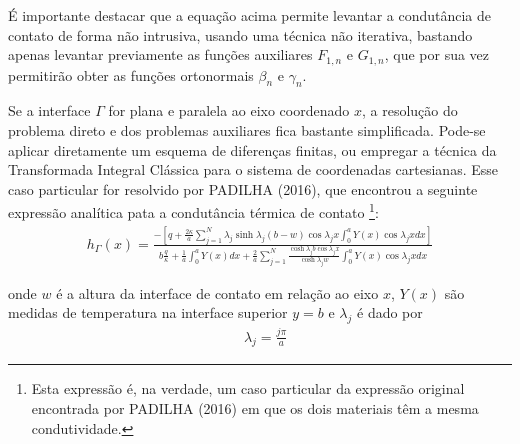 É importante destacar que a equação acima permite levantar a condutância de contato de forma não intrusiva, usando uma técnica não iterativa, bastando
apenas levantar previamente as funções auxiliares $F_{1, n}$ e $G_{1, n}$, que por sua vez permitirão obter as funções ortonormais $\beta_n$ e $\gamma_n$.

Se a interface $\Gamma$ for plana e paralela
ao eixo coordenado $x$, a resolução do problema direto e dos problemas auxiliares fica bastante simplificada. Pode-se aplicar diretamente
um esquema de diferenças finitas, ou empregar a técnica da Transformada Integral Clássica para o sistema de coordenadas cartesianas.
Esse caso particular for resolvido por PADILHA (2016), %
que encontrou a seguinte expressão analítica pata a condutância térmica de contato
\footnote{Esta expressão é, na verdade, um caso particular da expressão original encontrada por PADILHA (2016) %
em que os dois materiais têm a mesma condutividade.}:
\begin{align}
	h_\Gamma(x) = \frac{
					-\left[
						q + \displaystyle\frac{2\kappa}{a}\sum_{j=1}^N \lambda_j\sinh\lambda_j (b - w) \cos\lambda_j x \int_0^a Y(x)\cos \lambda_j x dx
					\right]
						}
						{
							b\displaystyle\frac{q}{\kappa} + \frac{1}{a}\int_0^a Y(x)dx 
							+
							\frac{2}{a}\sum_{j=1}^N 
							\frac{\cosh\lambda_j b\cos\lambda_j x}{\cosh\lambda_jw}
							\int_0^a Y(x)\cos \lambda_j x dx
						}\label{padilha}
\end{align}

onde $w$ é a altura da interface de contato em relação ao eixo $x$, $Y(x)$ são medidas de temperatura na interface superior $y = b$ e $\lambda_j$ é dado por
\begin{align}
	& \lambda_j = \frac{j\pi}{a}
\end{align}